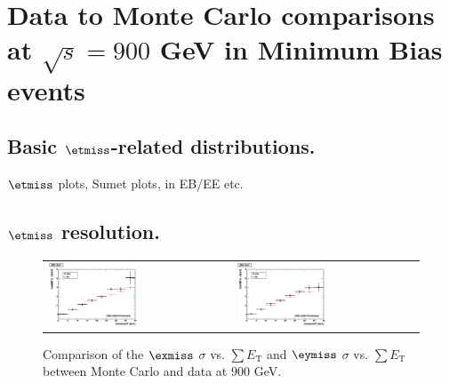 \section{Data to Monte Carlo comparisons at $\sqrt{s}=900$ GeV in
  Minimum Bias events}


\subsection{Basic $\etmiss$-related distributions.}
$\etmiss$ plots, Sumet plots, in EB/EE etc.

\subsection{$\etmiss$ resolution.}

\begin{figure}[h!]
 \centering
 \begin{tabular}{ll}
  \includegraphics[width=0.5\textwidth]{plots_DataVsMC_MB_900GeV/h_metxsigma_sumet_900.eps} &
  \includegraphics[width=0.5\textwidth]{plots_DataVsMC_MB_900GeV/h_metysigma_sumet_900.eps} \\
 \end{tabular}
 \caption{\small Comparison of the $\exmiss$ $\sigma$ vs. $\sum E_\text{T}$ and $\eymiss$ $\sigma$ vs. $\sum E_\text{T}$ between 
          Monte Carlo and data at $900$ GeV.\label{fig:MExySigma_vs_SumET_900}}
\end{figure}

